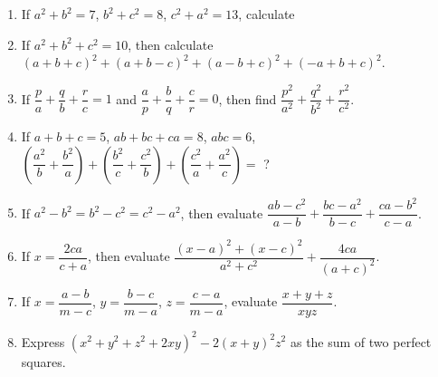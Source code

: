 \begin{enumerate}
		\item If \(a^2+b^2=7\), \(b^2+c^2=8\), \(c^2+a^2=13\), calculate 
		\item If \(a^2+b^2+c^2=10\), then calculate \((a+b+c)^2+(a+b-c)^2+(a-b+c)^2+(-a+b+c)^2\). %
		\item If $\dfrac{p}{a}+\dfrac{q}{b}+\dfrac{r}{c}=1$ and $\dfrac{a}{p}+\dfrac{b}{q}+\dfrac{c}{r}=0$, then find $\dfrac{p^2}{a^2}+\dfrac{q^2}{b^2}+\dfrac{r^2}{c^2}$.
		\item If $a+b+c=5$, $ab+bc+ca=8$, $abc=6$, $\left(\dfrac{a^2}{b}+\dfrac{b^2}{a}\right)+\left(\dfrac{b^2}{c}+\dfrac{c^2}{b}\right)+\left(\dfrac{c^2}{a}+\dfrac{a^2}{c}\right)=$ ? %
		\item If $a^2-b^2=b^2-c^2=c^2-a^2$, then evaluate $\dfrac{ab-c^2}{a-b}+\dfrac{bc-a^2}{b-c}+\dfrac{ca-b^2}{c-a}$. %
		\item If $x=\dfrac{2ca}{c+a}$, then evaluate $\dfrac{(x-a)^2+(x-c)^2}{a^2+c^2}+\dfrac{4ca}{(a+c)^2}$. %
		\item If $x=\dfrac{a-b}{m-c}$, $y=\dfrac{b-c}{m-a}$, $z=\dfrac{c-a}{m-a}$, evaluate $\dfrac{x+y+z}{xyz}$. %
		\item Express $(x^2+y^2+z^2+2xy)^2-2(x+y)^2z^2$ as the sum of two perfect squares. %



\end{enumerate}
